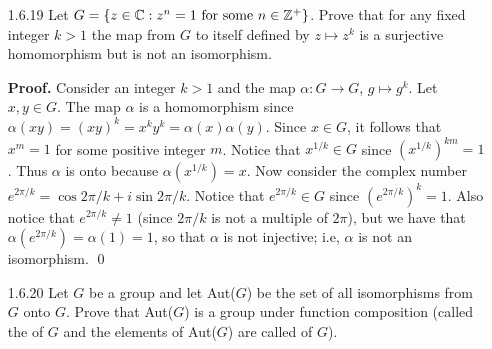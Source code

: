 \begin{enumerate}
      ($\Leftarrow$) Assume that $G$ is abelian. Then it
      follows that
      \begin{align*}
         \alpha(xy) &= (xy)^2 &[\text{Definition}] \\
            &= x^2y^2 &[\text{Exercise 1.1.24}] \\
            &= \alpha(x)\alpha(y),
      \end{align*}
      so that $\alpha$ is a homomorphism.

      ($\Rightarrow$) Assume that $\alpha$ is a homomorphism. Then it
      follows that
      \begin{align*}
         x^2y^2 &= \alpha(x)\alpha(y) \\
            &= \alpha(xy) \\
            &= (xy)^2 \\
            &= xyxy,
      \end{align*}
      so that $xxyy = xyxy$. By cancellation we thus have $xy = yx$; i.e, $G$ is
      abelian. \qed
   \item[1.6.19]  Let $G = \{z \in \mathbb{C} : z^n = 1 \text{ for some }n \in \mathbb{Z}^+\}$.
                  Prove that for any fixed integer $k > 1$ the map from $G$ to
                  itself defined by $z \mapsto z^k$ is a surjective homomorphism
                  but is not an isomorphism.

      \textbf{Proof.} Consider an integer $k > 1$ and the map
      $\alpha : G \rightarrow G$, $g \mapsto g^k$. Let $x, y \in G$. The map
      $\alpha$ is a homomorphism since
      $\alpha(xy) = (xy)^k = x^ky^k = \alpha(x)\alpha(y)$. Since $x \in G$, it
      follows that $x^m = 1$ for some positive integer $m$. Notice that
      $x^{1/k} \in G$ since $(x^{1/k})^{km} = 1$. Thus $\alpha$ is onto because
      $\alpha(x^{1/k}) = x$. Now consider the complex number
      $e^{2\pi/k} = \cos2\pi/k + i \sin2\pi/k$. Notice that $e^{2\pi/k} \in G$
      since $(e^{2\pi/k})^k = 1$. Also notice that $e^{2\pi/k} \neq 1$ (since
      $2\pi/k$ is not a multiple of $2\pi$), but we have that
      $\alpha(e^{2\pi/k}) = \alpha(1) = 1$, so that $\alpha$ is not injective; 
      i.e, $\alpha$ is not an isomorphism. \qed
   \item[1.6.20]  Let $G$ be a group and let Aut($G$) be the set of all
                  isomorphisms from $G$ onto $G$. Prove that Aut($G$) is a
                  group under function composition (called the
                   of $G$ and the elements of Aut($G$)
                  are called  of $G$).


\end{enumerate}

